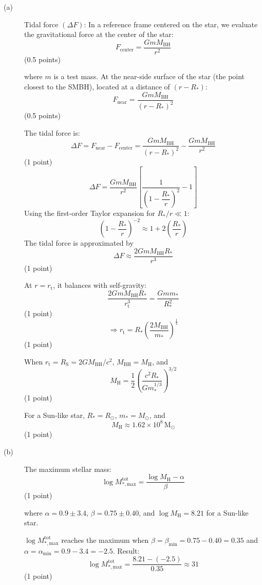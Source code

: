 \begin{description}
\item[(a)] Tidal force $(\Delta F)$: In a reference frame centered on the
  star, we evaluate the gravitational force at the center of the star:
  \[ F_{\mathrm{center}} = \frac{G m M_{\mathrm{BH}}}{r^2} \]
  \hfill(0.5 points)

  where $m$ is a test mass. At the near-side surface of the star (the point
  closest to the SMBH), located at a distance of $(r - R_*)$:
  \[ F_{\mathrm{near}} = \frac{G m M_{\mathrm{BH}}}{(r - R_*)^2} \]
  \hfill(0.5 points)

  The tidal force is:
  \[
  \Delta F = F_{\mathrm{near}} - F_{\mathrm{center}}
    = \frac{G m M_{\mathrm{BH}}}{(r - R_*)^2}
    - \frac{G m M_{\mathrm{BH}}}{r^2}
  \]
  \hfill(1 point)
  \[
  \Delta F = \frac{G m M_{\mathrm{BH}}}{r^2}
    \left[ \frac{1}{\left(1 - \dfrac{R_*}{r}\right)^2} - 1 \right]
  \]
  Using the first-order Taylor expansion for $R_*/r \ll 1$:
  \[
  \left( 1 - \frac{R_*}{r} \right)^{-2} \approx 1 + 2\left( \frac{R_*}{r} \right)
  \]
  The tidal force is approximated by
  \[ \Delta F \approx \frac{2 G m M_{\mathrm{BH}} R_*}{r^3} \]
  \hfill(1 point)

  At $r = r_{\mathrm{t}}$, it balances with self-gravity:
  \[
  \frac{2 G m M_{\mathrm{BH}} R_*}{r_{\mathrm{t}}^3} = \frac{G m m_*}{R_*^2}
  \]
  \hfill(1 point)
  \[
  \Longrightarrow r_{\mathrm{t}} = R_* \left( \frac{2 M_{\mathrm{BH}}}{m_*} \right)^{\frac{1}{3}}
  \]
  \hfill(1 point)

  When $r_{\mathrm{t}} = R_{\mathrm{S}} = 2GM_{\mathrm{BH}}/c^2$,
  $M_{\mathrm{BH}} = M_{\mathrm{H}}$, and
  \[
  M_{\mathrm{H}} = \frac{1}{2} \left( \frac{c^2 R_*}{G m_*^{1/3}} \right)^{3/2}
  \]
  \hfill(1 point)

  For a Sun-like star, $R_* = R_\odot$, $m_* = M_\odot$, and
  \[ M_{\mathrm{H}} \approx 1.62 \times 10^8\,\mathrm{M}_\odot \]
  \hfill(1 point)

\item[(b)] The maximum stellar mass:
  \[
  \log M_{*,\mathrm{max}}^{\mathrm{tot}}
    = \frac{\log M_{\mathrm{H}} - \alpha}{\beta}
  \]
  \hfill(1 point)

  where $\alpha = 0.9 \pm 3.4$, $\beta = 0.75 \pm 0.40$, and
  $\log M_{\mathrm{H}} = 8.21$ for a Sun-like star.

  $\log M_{*,\mathrm{max}}^{\mathrm{tot}}$ reaches the maximum when
  $\beta = \beta_{\mathrm{min}} = 0.75 - 0.40 = 0.35$ and
  $\alpha = \alpha_{\mathrm{min}} = 0.9 - 3.4 = -2.5$. Result:
  \[
  \log M_{*,\mathrm{max}}^{\mathrm{tot}} = \frac{8.21 - (-2.5)}{0.35} \approx 31
  \]
  \hfill(1 point)


\end{description}
